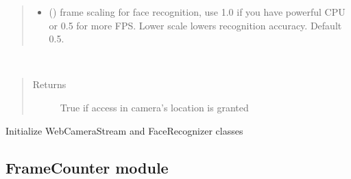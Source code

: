 \documentclass[letterpaper,10pt,english]{sphinxmanual}
\begin{document}
\begin{fulllineitems}
\begin{quote}
\begin{description}
\begin{itemize}
\item {} 
 () \textendash{} frame scaling for face recognition, use 1.0 if you have powerful CPU or 0.5 for more FPS. Lower scale lowers recognition accuracy. Default 0.5.

\end{itemize}

\end{description}\end{quote}

\begin{fulllineitems}
\label{\detokenize{doc/VideoStream/CameraAndFaceRecognizerCarrier:CameraAndFaceRecognizerCarrier.CameraAndFaceRecognizerCarrier.is_access_granted}}~\begin{quote}\begin{description}
\item[{Returns}] \leavevmode
True if access in camera’s location is granted

\end{description}\end{quote}

\end{fulllineitems}


\begin{fulllineitems}
\label{\detokenize{doc/VideoStream/CameraAndFaceRecognizerCarrier:CameraAndFaceRecognizerCarrier.CameraAndFaceRecognizerCarrier.start_carrier}}
Initialize WebCameraStream and FaceRecognizer classes

\end{fulllineitems}


\end{fulllineitems}



\subsection{FrameCounter module}
\label{\detokenize{doc/VideoStream/FrameCounter:module-FrameCounter}}\label{\detokenize{doc/VideoStream/FrameCounter:framecounter-module}}\label{\detokenize{doc/VideoStream/FrameCounter::doc}}
\end{document}
